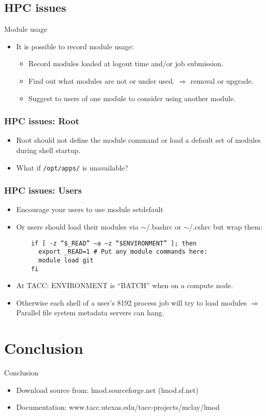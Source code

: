 \documentclass{beamer}
\begin{document}
\subsection{HPC issues}

\begin{frame}{Module usage}
  \begin{itemize}
    \item It is possible to record module usage:
      \begin{itemize}
        \item Record modules loaded at logout time and/or job submission.
        \item Find out what modules are not or under used.
          $\Rightarrow$ removal or upgrade.
        \item Suggest to users of one module to consider using another module.
      \end{itemize}
  \end{itemize}
\end{frame}



\begin{frame}[fragile]
    \frametitle{HPC issues: Root}
  \begin{itemize}
    \item Root should not define the module command or load a default
      set of modules during shell startup.
    \item What if \texttt{/opt/apps/} is unavailable?

  \end{itemize}
\end{frame}

\begin{frame}[fragile]
    \frametitle{HPC issues: Users}
  \begin{itemize}
    \item Encourage your users to use {\color{blue}module setdefault}
    \item Or users should load their modules via $\sim$/.bashrc or
      $\sim$/.cshrc but wrap them:
    {\small
\begin{verbatim}
    if [ -z “$_READ” –a –z “$ENVIRONMENT” ]; then
      export _READ=1 # Put any module commands here:
      module load git
    fi
\end{verbatim}
}
\item  At TACC: ENVIRONMENT is ``BATCH'' when on a compute node.
\item Otherwise each shell of a user's 8192 process job will try to
  load modules $\Rightarrow$ Parallel file system metadata servers can hang.
  \end{itemize}
\end{frame}




\section{Conclusion}

\begin{frame}{Conclusion}
  \begin{itemize}
    \item Download source from: lmod.sourceforge.net (lmod.sf.net)
    \item Documentation: www.tacc.utexas.edu/tacc-projects/mclay/lmod
  \end{itemize}
\end{frame}
\end{document}
